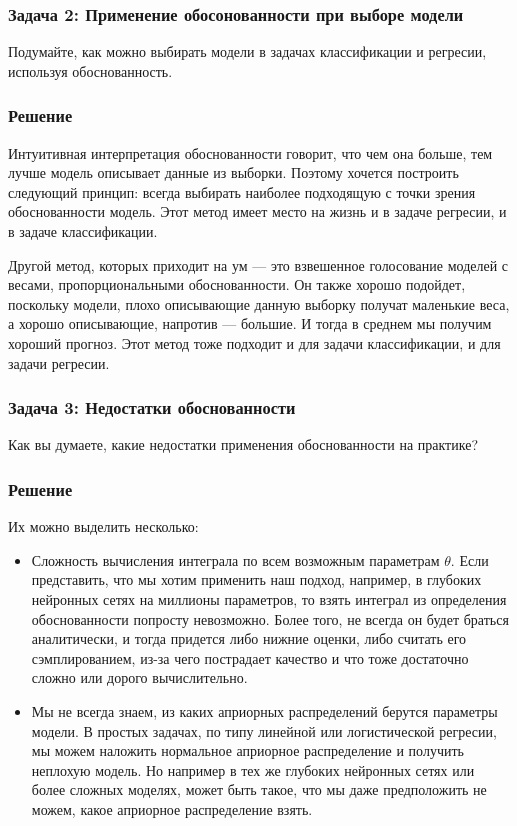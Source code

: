 \subsubsection{Задача 2: Применение обосонованности при выборе модели}
Подумайте, как можно выбирать модели в задачах классификации и регресии, используя обоснованность.
\subsubsection{Решение}

Интуитивная интерпретация обоснованности говорит, что чем она больше, тем лучше модель описывает данные из выборки. Поэтому хочется построить следующий принцип: всегда выбирать наиболее подходящую с точки зрения обоснованности модель. Этот метод имеет место на жизнь и в задаче регресии, и в задаче классификации.

Другой метод, которых приходит на ум --- это взвешенное голосование моделей с весами, пропорциональными обоснованности. Он также хорошо подойдет, поскольку модели, плохо описывающие данную выборку получат маленькие веса, а хорошо описывающие, напротив --- большие. И тогда в среднем мы получим хороший прогноз. Этот метод тоже подходит и для задачи классификации, и для задачи регресии.

\subsubsection{Задача 3: Недостатки обоснованности}
Как вы думаете, какие недостатки применения обоснованности на практике?
\subsubsection{Решение}

Их можно выделить несколько:
\begin{itemize}
 \item Сложность вычисления интеграла по всем возможным параметрам $\theta$. Если представить, что мы хотим применить наш подход, например, в глубоких нейронных сетях на миллионы параметров, то взять интеграл из определения обоснованности попросту невозможно. Более того, не всегда он будет браться аналитически, и тогда придется либо нижние оценки, либо считать его сэмплированием, из-за чего пострадает качество и что тоже достаточно сложно или дорого вычислительно.
 \item Мы не всегда знаем, из каких априорных распределений берутся параметры модели. В простых задачах, по типу линейной или логистической регресии, мы можем наложить нормальное априорное распределение и получить неплохую модель. Но например в тех же глубоких нейронных сетях или более сложных моделях, может быть такое, что мы даже предположить не можем, какое априорное распределение взять.
\end{itemize}
